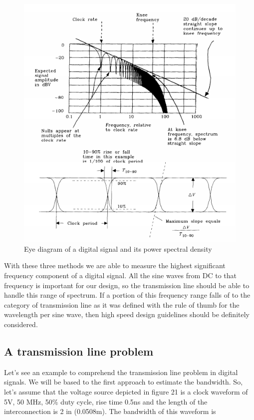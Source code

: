 \documentclass[final]{cubedoc}
\begin{document}
	
	\begin{figure}[h!]
		\centering
		\includegraphics[keepaspectratio, width = \textwidth]{assets/eye_spectra.png}
		\caption{Eye diagram of a digital signal and its power spectral density \cite[p.3]{johnson2003high}}
	\end{figure}
	
	With these three methods we are able to measure the highest significant frequency component of a digital signal. All the sine waves from DC to that frequency is important for our design, so the transmission line should be able to handle this range of spectrum. If a portion of this frequency range falls of to the category of transmission line as it was defined with the rule of thumb for the wavelength per sine wave, then high speed design guidelines should be definitely considered. 
	
	\subsection{A transmission line problem}
	
	Let's see an example to comprehend the transmission line problem in digital signals. We will be based to the first approach to estimate the bandwidth. So, let's assume that the voltage source depicted in figure 21 is a clock waveform of 5V, 50 MHz, 50\% duty cycle, rise time 0.5ns and the length of the interconnection is 2 in (0.0508m). The bandwidth of this waveform is
	
\end{document}
